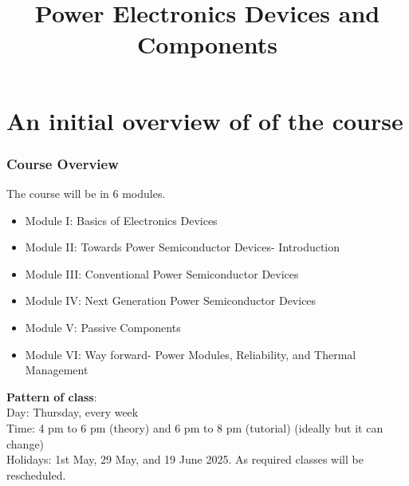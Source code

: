 \section{An initial overview of of the course}
\title[Initial overview]{Power Electronics Devices and Components}
 
\begin{frame}[plain]
    \titlepage
\end{frame}
\begin{frame}
	\frametitle{Course Overview}
The course will be in 6 modules.
		\begin{itemize}
		  \item Module I: Basics of Electronics Devices
		  \item Module II: Towards Power Semiconductor Devices- Introduction
		  \item Module III: Conventional Power Semiconductor Devices
		  \item Module IV: Next Generation Power Semiconductor Devices
		  \item Module V: Passive Components
		  \item Module VI: Way forward- Power Modules, Reliability, and Thermal Management
		\end{itemize}
\textbf{Pattern of class}: \\ Day: Thursday, every week \\ 
Time: 4 pm to 6 pm (theory) and 6 pm to 8 pm (tutorial) (ideally but it can change) \\
Holidays: 1st May, 29 May, and 19 June 2025. As required classes will be rescheduled. 
\end{frame}

